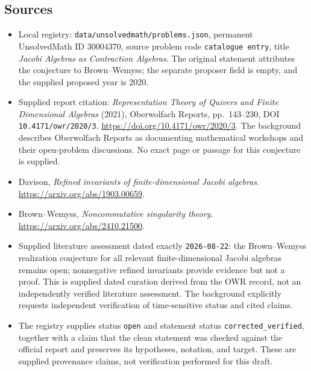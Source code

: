 \documentclass[11pt]{article}
\begin{document}
\subsection{Sources}
\begin{itemize}
\item Local registry: \texttt{data/unsolvedmath/problems.json}, permanent UnsolvedMath ID \(30004370\), source problem code \texttt{catalogue entry}, title \emph{Jacobi Algebras as Contraction Algebras}. The original statement attributes the conjecture to Brown--Wemyss; the separate proposer field is empty, and the supplied proposed year is 2020.
\item Supplied report citation: \emph{Representation Theory of Quivers and Finite Dimensional Algebras} (2021), Oberwolfach Reports, pp.~143--230, DOI \texttt{10.4171/owr/2020/3}. \url{https://doi.org/10.4171/owr/2020/3}. The background describes Oberwolfach Reports as documenting mathematical workshops and their open-problem discussions. No exact page or passage for this conjecture is supplied.
\item Davison, \emph{Refined invariants of finite-dimensional Jacobi algebras}. \url{https://arxiv.org/abs/1903.00659}.
\item Brown--Wemyss, \emph{Noncommutative singularity theory}. \url{https://arxiv.org/abs/2410.21500}.
\item Supplied literature assessment dated exactly \texttt{2026-08-22}: the Brown--Wemyss realization conjecture for all relevant finite-dimensional Jacobi algebras remains open; nonnegative refined invariants provide evidence but not a proof. This is supplied dated curation derived from the OWR record, not an independently verified literature assessment. The background explicitly requests independent verification of time-sensitive status and cited claims.
\item The registry supplies status \texttt{open} and statement status \texttt{corrected\_verified}, together with a claim that the clean statement was checked against the official report and preserves its hypotheses, notation, and target. These are supplied provenance claims, not verification performed for this draft.
\end{itemize}
\end{document}
